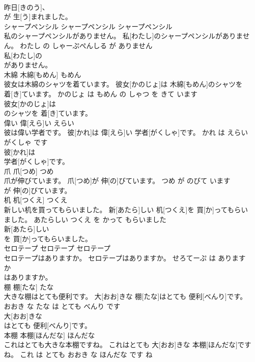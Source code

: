 \documentclass[8pt]{extreport}
\begin{document}
\begin{CJK}{UTF8}{min}
\\	昨日[きのう]、
\\	が 生[う]まれました。			
\\	シャープペンシル	シャープペンシル	シャープペンシル	
\\	私のシャープペンシルがありません。	私[わたし]のシャープペンシルがありません。	わたし の しゃーぷぺんしる が ありません	
\\	私[わたし]の
\\	がありません。			
\\	木綿	木綿[もめん]	もめん	
\\	彼女は木綿のシャツを着ています。	彼女[かのじょ]は 木綿[もめん]のシャツを 着[き]ています。	かのじょ は もめん の しゃつ を きて います	
\\	彼女[かのじょ]は
\\	のシャツを 着[き]ています。			
\\	偉い	偉[えら]い	えらい	
\\	彼は偉い学者です。	彼[かれ]は 偉[えら]い 学者[がくしゃ]です。	かれ は えらい がくしゃ です	
\\	彼[かれ]は
\\	学者[がくしゃ]です。			
\\	爪	爪[つめ]	つめ	
\\	爪が伸びています。	爪[つめ]が 伸[の]びています。	つめ が のびて います	
\\	が 伸[の]びています。			
\\	机	机[つくえ]	つくえ	
\\	新しい机を買ってもらいました。	新[あたら]しい 机[つくえ]を 買[か]ってもらいました。	あたらしい つくえ を かって もらいました	
\\	新[あたら]しい
\\	を 買[か]ってもらいました。			
\\	セロテープ	セロテープ	セロテープ	
\\	セロテープはありますか。	セロテープはありますか。	せろてーぷ は あります か	
\\	はありますか。			
\\	棚	棚[たな]	たな	
\\	大きな棚はとても便利です。	大[おお]きな 棚[たな]はとても 便利[べんり]です。	おおき な たな は とても べんり です	
\\	大[おお]きな
\\	はとても 便利[べんり]です。			
\\	本棚	本棚[ほんだな]	ほんだな	
\\	これはとても大きな本棚ですね。	これはとても 大[おお]きな 本棚[ほんだな]ですね。	これ は とても おおき な ほんだな です ね	

\end{CJK}
\end{document}

